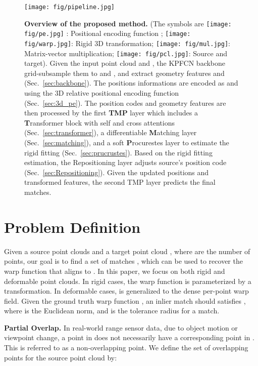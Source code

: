 \begin{figure*}
    \centering
    \texttt{[image: fig/pipeline.jpg]}
    \caption{
\textbf{Overview of the proposed method.}
(The symbols are 
\texttt{[image: fig/pe.jpg]} 
: Positional encoding function ;
\texttt{[image: fig/warp.jpg]}: 
Rigid 3D transformation;
\texttt{[image: fig/mul.jpg]}: 
Matrix-vector multiplication;
\texttt{[image: fig/pcl.jpg]}: 
Source and target).
Given the input point cloud  and , the KPFCN backbone grid-subsample them to  and , and extract geometry features  and  (Sec.~\ref{sec:backbone}). 
The positions informations are encoded as  and  using the 3D relative positional encoding function (Sec.~\ref{sec:3d_pe}).
The position codes and geometry features are then processed by the first \textbf{TMP} layer which includes a \textbf{T}ransformer block with self and cross attentions (Sec.~\ref{sec:transformer}), a differentiable \textbf{M}atching layer (Sec.~\ref{sec:matching}), and a soft \textbf{P}rocurestes layer to estimate the rigid fitting  (Sec.~\ref{sec:prucrustes}).  Based on the rigid fitting estimation, the Repositioning layer adjusts source's position code  (Sec.~\ref{sec:Repositioning}). Given the updated positions and transformed features, the second TMP layer predicts the final matches. }
    \label{fig:pipeline}
\end{figure*}

\section{Problem Definition}
Given a source point clouds  and a target point cloud , where  are the number of points, 
our goal is to find a set of matches , which can be used to recover the warp function  that aligns  to . 
In this paper, we focus on both rigid and deformable point clouds.
In rigid cases, the warp function  is parameterized by a  transformation.
In deformable cases,  is generalized to the dense per-point warp field.
Given the ground truth warp function ,
an inlier match  should satisfies 
,
where  is the Euclidean norm, and  is the tolerance radius for a match. 

\smallskip
\noindent
\textbf{Partial Overlap.}
In real-world range sensor data, due to object motion or viewpoint change, a point in  does not necessarily have a corresponding point in . This is referred to as a non-overlapping point. 
We define the set of overlapping points  for the source point cloud by:

